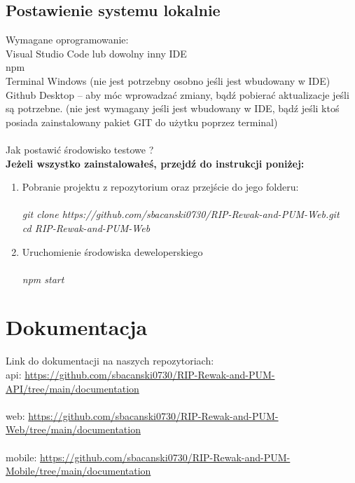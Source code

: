 \documentclass{article}
\begin{document}
\subsection{Postawienie systemu lokalnie}
Wymagane oprogramowanie:\\
Visual Studio Code lub dowolny inny IDE\\
npm\\
Terminal Windows (nie jest potrzebny osobno jeśli jest wbudowany w IDE)\\
Github Desktop – aby móc wprowadzać zmiany, bądź pobierać aktualizacje jeśli są potrzebne. (nie jest wymagany  jeśli jest wbudowany w IDE, bądź jeśli ktoś posiada zainstalowany pakiet GIT do użytku poprzez terminal)\\\\
Jak postawić środowisko testowe ?\\
\textbf{Jeżeli wszystko zainstalowałeś, przejdź do instrukcji poniżej:}
\begin{enumerate}
    \item Pobranie projektu z repozytorium oraz przejście do jego folderu: \\\\
    \emph{ git clone https://github.com/sbacanski0730/RIP-Rewak-and-PUM-Web.git} \\
   			 \emph{ cd RIP-Rewak-and-PUM-Web} \\
    \item Uruchomienie środowiska deweloperskiego\\\\
    \emph{npm start} \\
    \end{enumerate}
    


\section{Dokumentacja}
Link do dokumentacji na naszych repozytoriach: \\
api: \url{https://github.com/sbacanski0730/RIP-Rewak-and-PUM-API/tree/main/documentation}\\\\
web: \url{https://github.com/sbacanski0730/RIP-Rewak-and-PUM-Web/tree/main/documentation}\\\\
mobile: \url{https://github.com/sbacanski0730/RIP-Rewak-and-PUM-Mobile/tree/main/documentation}\\\\
\end{document}
